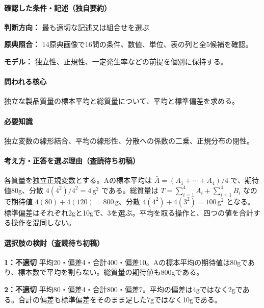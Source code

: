 \paragraph{確認した条件・記述（独自要約）}\mbox{}\par

\noindent\textbf{判断方向：} 最も適切な記述又は組合せを選ぶ\par

\noindent\textbf{原典照合：} 14原典画像で16問の条件、数値、単位、表の列と全5候補を確認。\par

\noindent\textbf{モデル：} 独立性、正規性、一定発生率などの前提を個別に保持する。\par

\paragraph{問われる核心} 独立な製品質量の標本平均と総質量について、平均と標準偏差を求める。

\paragraph{必要知識} 独立変数の線形結合、平均の線形性、分散への係数の二乗、正規分布の閉性。

\paragraph{考え方・正答を選ぶ理由（査読待ち初稿）} 各質量を独立正規変数とする。Aの標本平均は \(\bar A=(A_1+\cdots+A_4)/4\) で、期待値80g、分散 \(4(4^2)/4^2=4\,\mathrm{g^2}\) である。総質量は \(T=\sum_{i=1}^4A_i+\sum_{i=1}^4B_i\) なので期待値 \(4(80)+4(120)=800\,\mathrm g\)、分散 \(4(4^2)+4(3^2)=100\,\mathrm{g^2}\) となる。標準偏差はそれぞれ2gと10gで、3を選ぶ。平均を取る操作と、四つの値を合計する操作を混同しない。

\paragraph{選択肢の検討（査読待ち初稿）}\mbox{}\par

\noindent\textbf{1：不適切} 平均20・偏差4・合計400・偏差10。Aの標本平均の期待値は80gであり、標本数で平均を割らない。総質量の期待値も800gである。\par

\noindent\textbf{2：不適切} 平均80・偏差4・合計800・偏差7。平均の偏差は4gではなく2gである。合計の偏差も標準偏差をそのまま足した7gではなく10gである。\par

